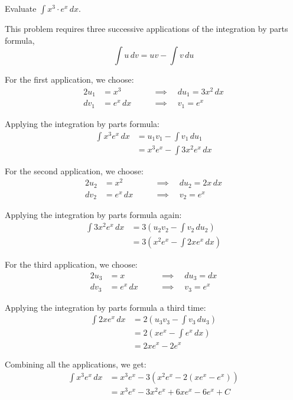 \bigskip

\begin{example} Evaluate $\int  x^3 \cdot e^x \, dx$.    
\end{example}

\solution This problem requires three successive applications of the integration by parts formula,
\[
\int u \, dv = uv - \int v \, du
\]

For the first application, we choose:
\begin{alignat*}{2}
u_1 &= x^3 && \quad \implies \quad du_1 = 3x^2 \, dx \\
dv_1 &= e^x \, dx && \quad \implies \quad v_1 = e^x
\end{alignat*}

Applying the integration by parts formula:
\begin{align*}
\int x^3 e^x \, dx &= u_1 v_1 - \int v_1 \, du_1 \\
&= x^3 e^x - \int 3x^2 e^x \, dx
\end{align*}


For the second application, we choose:
\begin{alignat*}{2}
u_2 &= x^2 && \quad \implies \quad du_2 = 2x \, dx \\
dv_2 &= e^x \, dx && \quad \implies \quad v_2 = e^x
\end{alignat*}

Applying the integration by parts formula again:
\begin{align*}
\int 3x^2 e^x \, dx &= 3(u_2 v_2 - \int v_2 \, du_2) \\
&= 3(x^2 e^x - \int 2x e^x \, dx)
\end{align*}


For the third application, we choose:
\begin{alignat*}{2}
u_3 &= x && \quad \implies \quad du_3 = dx \\
dv_3 &= e^x \, dx && \quad \implies \quad v_3 = e^x
\end{alignat*}


Applying the integration by parts formula a third time:
\begin{align*}
\int 2x e^x \, dx &= 2(u_3 v_3 - \int v_3 \, du_3) \\
&= 2(x e^x - \int e^x \, dx) \\
&= 2x e^x - 2e^x
\end{align*}

Combining all the applications, we get:
\begin{align*}
\int x^3 e^x \, dx &= x^3 e^x - 3(x^2 e^x - 2(x e^x - e^x)) \\
&= x^3 e^x - 3x^2 e^x + 6x e^x - 6e^x + C
\end{align*}

